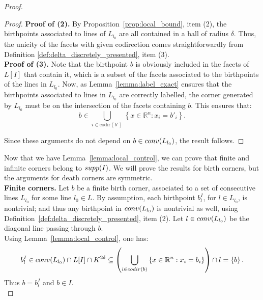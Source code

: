 \documentclass{article}
\newcommand{\conv}[1]{ {\rm conv}(#1) }
\newcommand{\codir}[1]{ {\rm codir}(#1) }
\newcommand{\R}{\mathbb{R}}
\newcommand{\lowerb}[1]{ L[#1] }
\newcommand{\supp}[1]{ {\rm supp}(#1) }
\begin{document}
\begin{proof}
\begin{proof}
			\textbf{Proof of (2).} By Proposition~\ref{prop:local_bound}, item (2),
			the birthpoints associated to lines of $L_{l_0}$ are all contained in a ball of radius $\delta$.
			Thus, the unicity of the facets with given codirection comes straightforwardly from Definition \ref{def:delta_discretely_presented}, item (3). \\

			\textbf{Proof of (3).} Note that the birthpoint $b$ is obviously included in
			the facets of $\lowerb{I}$ that contain it, which is a subset of the facets associated to the birthpoints of the lines in $L_{l_0}$.
			Now, as Lemma~\ref{lemma:label_exact} ensures that the birthpoints
			associated to lines in $L_{l_0}$ are correctly labelled, the corner generated by $L_{l_0}$ must be on the intersection of the facets containing $b$.
			This ensures that:
			\begin{equation*}
				b\in \bigcup_{i \in \mathrm{ codir}(b')} \left\{ x \in\R^n : x_i  = b'_i \right\}.
			\end{equation*}

			Since these arguments do not depend on $b\in\conv{L_{l_0}}$, the result follows.
		\end{proof}

		Now that we have Lemma~\ref{lemma:local_control}, we can prove that finite
		and infinite corners belong to $\supp{I}$. We will prove the results for birth corners, but the arguments for death corners are symmetric.\\

		\textbf{Finite corners.} %
		Let $b$ be a finite birth corner, associated to a set of consecutive lines $L_{l_0}$ for some line $l_0\in L$. %
		By assumption, each birthpoint $b_l^I$, for $l \in L_{l_0}$, is nontrivial; and thus any birthpoint in $\conv{L_{l_0}}$ is nontrivial as well, using
		Definition~\ref{def:delta_discretely_presented}, item (2). Let $l \in \conv{L_{l_0}}$ be the diagonal line passing through $b$.
		\\
		Using Lemma~\ref{lemma:local_control}, one has:
		\begin{equation*}
			b_{l}^I \in \conv{L_{l_0}} \cap \lowerb{I} \cap K^{2\delta} \subseteq \left(\bigcup_{i\in \codir{b}} \left\{ x \in \R^n :x_i=b_i\right\}\right) \cap l = \left\{ b\right\}.
		\end{equation*}
		Thus $b=b_l^I$ and $b \in {I}$.
		\\


\end{proof}
\end{document}
